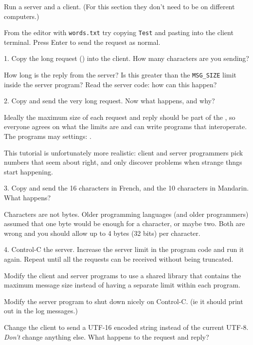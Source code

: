 Run a server and a client. (For this section they don't need to be on different
computers.)

From the editor with \texttt{words.txt} try copying \texttt{Test} and pasting into
the client terminal. Press Enter to send the request as normal.

1. Copy the long request () into the client. How many characters
are you sending?

How long is the reply from the server? Is this greater than the \texttt{MSG\_SIZE}
limit inside the server program? Read the server code: how can this happen?

2. Copy and send the very long request. Now what happens, and why?

\begin{IMPORTANT}
Ideally the maximum size of each request and reply should be part of the , so everyone agrees on what the limits are and can write programs that
interoperate. The programs may  settings:  .

This tutorial is unfortunately more realistic: client and server programmers pick
numbers that seem about right, and only discover problems when strange thngs start
happening.
\end{IMPORTANT}

3. Copy and send the 16 characters in French, and the 10 characters in Mandarin.
What happens?

\begin{IMPORTANT}
Characters are not bytes. Older programming languages (and older programmers) assumed
that one byte would be enough for a character, or maybe two. Both are wrong and you
should allow up to 4 bytes (32 bits) per character.
\end{IMPORTANT}

4. Control-C the server. Increase the server limit in the program code and run it
again. Repeat until all the requests can be received without being truncated.



Modify the client and server programs to use a shared library that contains the
maximum message size instead of having a separate limit within each program.

Modify the server program to shut down nicely on Control-C. (ie it should print out
 in the log messages.)

Change the client  to send a UTF-16 encoded string instead of the
current UTF-8. \emph{Don't} change anything else. What happens to the request and
reply?


\COPYRIGHT


